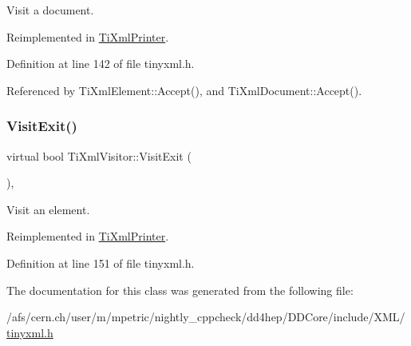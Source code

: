 Visit a document. 



Reimplemented in \hyperlink{class_ti_xml_printer_a0a636046fa589b6d7f3e5bd025b3f33e}{Ti\+Xml\+Printer}.



Definition at line 142 of file tinyxml.\+h.



Referenced by Ti\+Xml\+Element\+::\+Accept(), and Ti\+Xml\+Document\+::\+Accept().

\hypertarget{class_ti_xml_visitor_aec2b1f8116226d52f3a1b95dafd3a32c}{}\label{class_ti_xml_visitor_aec2b1f8116226d52f3a1b95dafd3a32c} 
\subsubsection{\texorpdfstring{Visit\+Exit()}{VisitExit()}\hspace{0.1cm}{\footnotesize\ttfamily [2/2]}}
{\footnotesize\ttfamily virtual bool Ti\+Xml\+Visitor\+::\+Visit\+Exit (\begin{DoxyParamCaption}\item[{const \hyperlink{class_ti_xml_element}{Ti\+Xml\+Element} \&}]{ }\end{DoxyParamCaption})\hspace{0.3cm}{\ttfamily [inline]}, {\ttfamily [virtual]}}



Visit an element. 



Reimplemented in \hyperlink{class_ti_xml_printer_ae6a1df8271df4bf62d7873c38e34aa69}{Ti\+Xml\+Printer}.



Definition at line 151 of file tinyxml.\+h.



The documentation for this class was generated from the following file\+:\begin{DoxyCompactItemize}
\item 
/afs/cern.\+ch/user/m/mpetric/nightly\+\_\+cppcheck/dd4hep/\+D\+D\+Core/include/\+X\+M\+L/\hyperlink{tinyxml_8h}{tinyxml.\+h}\end{DoxyCompactItemize}

